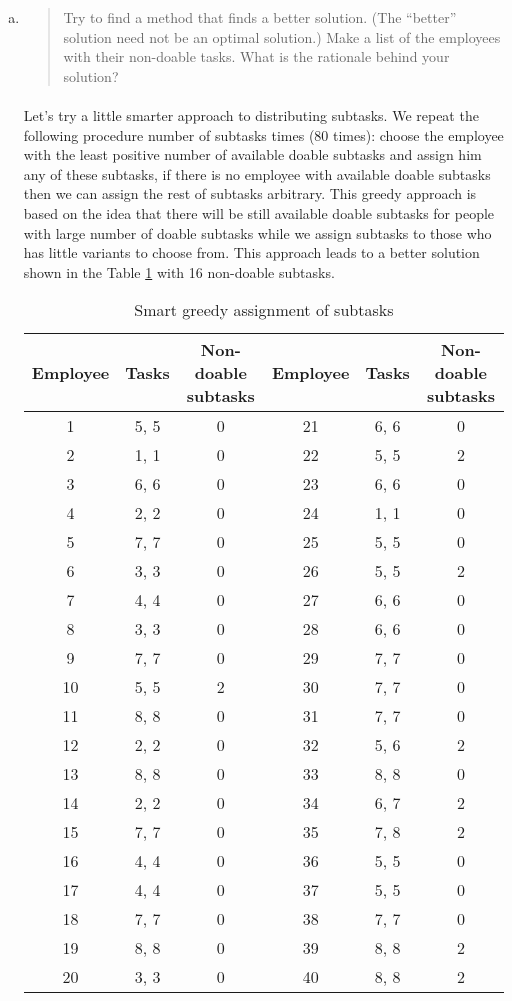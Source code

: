 \begin{enumerate}[(a)]
\item\begin{quote}Try to find a method that finds a better solution. (The ``better'' solution need not
be an optimal solution.) Make a list of the employees with their non-doable tasks.
What is the rationale behind your solution?\end{quote}

	\paragraph{}
	Let's try a little smarter approach to distributing subtasks. We repeat the following procedure number of subtasks times (80 times): choose the employee with the least positive number of available doable subtasks and assign him any of these subtasks, if there is no employee with available doable subtasks then we can assign the rest of subtasks arbitrary. This greedy approach is based on the idea that there will be still available doable subtasks for people with large number of doable subtasks while we assign subtasks to those who has little variants to choose from. This approach leads to a better solution shown in the Table \ref{greedy-3-b} with 16 non-doable subtasks.

\begin{table}[H]
	\centering
	\caption{Smart greedy assignment of subtasks}
	\begin{tabular}{ccc||ccc}\hline
Employee & Tasks & Non-doable subtasks & Employee & Tasks & Non-doable subtasks \\ \hline
1 & 5, 5 & 0 & 21 & 6, 6 & 0 \\
2 & 1, 1 & 0 & 22 & 5, 5 & 2 \\
3 & 6, 6 & 0 & 23 & 6, 6 & 0 \\
4 & 2, 2 & 0 & 24 & 1, 1 & 0 \\
5 & 7, 7 & 0 & 25 & 5, 5 & 0 \\
6 & 3, 3 & 0 & 26 & 5, 5 & 2 \\
7 & 4, 4 & 0 & 27 & 6, 6 & 0 \\
8 & 3, 3 & 0 & 28 & 6, 6 & 0 \\
9 & 7, 7 & 0 & 29 & 7, 7 & 0 \\
10 & 5, 5 & 2 & 30 & 7, 7 & 0 \\
11 & 8, 8 & 0 & 31 & 7, 7 & 0 \\
12 & 2, 2 & 0 & 32 & 5, 6 & 2 \\
13 & 8, 8 & 0 & 33 & 8, 8 & 0 \\
14 & 2, 2 & 0 & 34 & 6, 7 & 2 \\
15 & 7, 7 & 0 & 35 & 7, 8 & 2 \\
16 & 4, 4 & 0 & 36 & 5, 5 & 0 \\
17 & 4, 4 & 0 & 37 & 5, 5 & 0 \\
18 & 7, 7 & 0 & 38 & 7, 7 & 0 \\
19 & 8, 8 & 0 & 39 & 8, 8 & 2 \\
20 & 3, 3 & 0 & 40 & 8, 8 & 2 \\
\hline
	\end{tabular}
	\label{greedy-3-b}
\end{table}


\end{enumerate}
